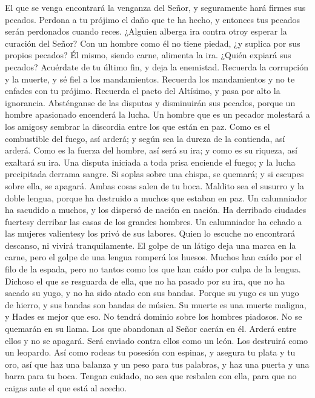  El que se venga encontrará la venganza del Señor, y
seguramente hará firmes sus pecados.  Perdona a tu prójimo
el daño que te ha hecho, y entonces tus pecados serán perdonados cuando
reces.  ¿Alguien alberga ira contra otroy esperar la
curación del Señor?  Con un hombre como él no tiene
piedad, ¿y suplica por sus propios pecados?  Él mismo,
siendo carne, alimenta la ira. ¿Quién expiará sus pecados?
 Acuérdate de tu último fin, y deja la enemistad. Recuerda
la corrupción y la muerte, y sé fiel a los mandamientos. 
Recuerda los mandamientos y no te enfades con tu prójimo. Recuerda el
pacto del Altísimo, y pasa por alto la ignorancia. 
Absténganse de las disputas y disminuirán sus pecados, porque un hombre
apasionado encenderá la lucha.  Un hombre que es un
pecador molestará a los amigosy sembrar la discordia entre los que están
en paz.  Como es el combustible del fuego, así arderá; y
según sea la dureza de la contienda, así arderá. Como es la fuerza del
hombre, así será su ira; y como es su riqueza, así exaltará su ira.
 Una disputa iniciada a toda prisa enciende el fuego; y
la lucha precipitada derrama sangre.  Si soplas sobre una
chispa, se quemará; y si escupes sobre ella, se apagará. Ambas cosas
salen de tu boca.  Maldito sea el susurro y la doble
lengua, porque ha destruido a muchos que estaban en paz. 
Un calumniador ha sacudido a muchos, y los dispersó de nación en nación.
Ha derribado ciudades fuertesy derribar las casas de los grandes
hombres.  Un calumniador ha echado a las mujeres
valientesy los privó de sus labores.  Quien lo escuche no
encontrará descanso, ni vivirá tranquilamente.  El golpe
de un látigo deja una marca en la carne, pero el golpe de una lengua
romperá los huesos.  Muchos han caído por el filo de la
espada, pero no tantos como los que han caído por culpa de la lengua.
 Dichoso el que se resguarda de ella, que no ha pasado
por su ira, que no ha sacado su yugo, y no ha sido atado con sus bandas.
 Porque su yugo es un yugo de hierro, y sus bandas son
bandas de música.  Su muerte es una muerte maligna, y
Hades es mejor que eso.  No tendrá dominio sobre los
hombres piadosos. No se quemarán en su llama.  Los que
abandonan al Señor caerán en él. Arderá entre ellos y no se apagará.
Será enviado contra ellos como un león. Los destruirá como un leopardo.
 Así como rodeas tu posesión con espinas, y asegura tu
plata y tu oro,  así que haz una balanza y un peso para
tus palabras, y haz una puerta y una barra para tu boca. 
Tengan cuidado, no sea que resbalen con ella, para que no caigas ante el
que está al acecho.

